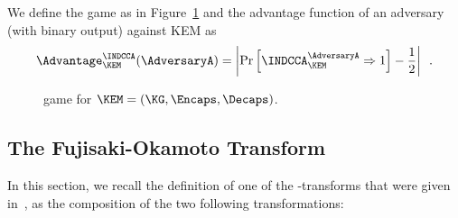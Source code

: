 	\begin{definition}[\INDCCA]\label{def:indcca}
		We define the \INDCCA game as in Figure~\ref{fig:def:IND-CCA}
		and the \INDCCA advantage function of an adversary \AdversaryA (with binary output) against KEM as 
		\[
			\Advantage_{\KEM}^{\INDCCA}(\AdversaryA)
			= \left| \Pr\left[\INDCCA^{\AdversaryA}_\KEM \Rightarrow 1\right] - \frac{1}{2} \right| \enspace .
		\]
		
		
		\begin{figure}[ht]
			\begin{center}
			\end{center}
			\caption{\INDCCA game for $\KEM = (\KG, \Encaps, \Decaps)$.}
			\label{fig:def:IND-CCA}
		\end{figure}
		
	\end{definition}
						
				
\subsection{The Fujisaki-Okamoto Transform}

	In this section, we recall the definition of one of the \FO-transforms that were given in~\cite{TCC:HofHovKil17},
	as the composition of the two following transformations:
	
